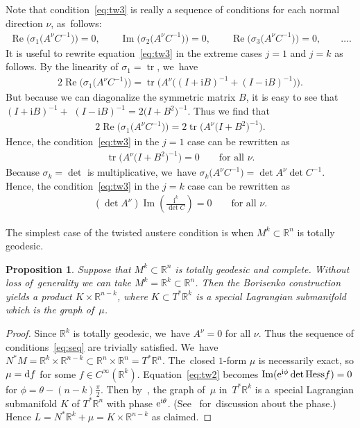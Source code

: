 \documentclass[10pt,a4paper]{amsart}
\def\R{\mathbb{R}}
\def\ri{\mathrm{i}}
\renewcommand{\Im}{\operatorname{Im}}
\renewcommand{\Re}{\operatorname{Re}}
\def\tr{\operatorname{tr}}
\newtheorem{Proposition}[Theorem]{Proposition}
\numberwithin{equation}{section}
\begin{document}
Note that condition~\eqref{eq:tw3} is really a sequence of conditions for each normal direction $\nu$, as~follows:
\begin{gather} \label{eq:seq}
\Re \big(\sigma_1 \big(A^\nu C^{-1}\big) \big) = 0, \qquad
\Im \big(\sigma_2 \big(A^\nu C^{-1}\big) \big) = 0, \qquad
\Re \big(\sigma_3 \big(A^\nu C^{-1}\big) \big) = 0, \qquad \dots.
\end{gather}
It is useful to rewrite equation~\eqref{eq:tw3} in the extreme cases $j=1$ and $j=k$ as follows. By the linearity of $\sigma_1 = \tr$, we~have
\begin{gather*}
2 \Re \big(\sigma_1 \big(A^\nu C^{-1}\big)\big) = \tr \big(A^{\nu} \big((I + \ri B)^{-1} + (I - \ri B)^{-1}\big)\big).
\end{gather*}
But because we can diagonalize the symmetric matrix $B$, it is easy to see that $(I + \ri B)^{-1} +$ $(I - \ri B)^{-1} = 2 \big(I + B^2\big)^{-1}$. Thus we find that
\begin{gather*}
2 \Re \big( \sigma_1 \big(A^\nu C^{-1}\big) \big) = 2 \tr \big( A^{\nu} \big(I + B^2\big)^{-1} \big).
\end{gather*}
Hence, the condition~\eqref{eq:tw3} in the $j=1$ case can be rewritten as
\begin{gather} \label{eq:tw3-special1}
\tr \big(A^{\nu} \big(I + B^2\big)^{-1}\big) = 0 \qquad \text{for all $\nu$}.
\end{gather}
Because $\sigma_k = \det$ is multiplicative, we~have $\sigma_k \big(A^{\nu} C^{-1}\big) = \det A^{\nu} \det C^{-1}$. Hence, the condition~\eqref{eq:tw3} in the $j=k$ case can be rewritten as
\begin{gather}\label{eq:tw3-specialk}
(\det A^{\nu}) \Im \left(\frac{\ri^k}{\det C}\right) = 0 \qquad \text{for all $\nu$}.
\end{gather}

The simplest case of the twisted austere condition is when $M^k \subset \R^n$ is totally geodesic.

\begin{Proposition} \label{prop:totally-geodesic}
Suppose that $M^k \subset \R^n$ is \emph{totally geodesic} and complete. Without loss of~gene\-ra\-lity we can take $M^k = \R^k \subset \R^n$. Then the Borisenko construction yields a pro\-duct $K \times \R^{n-k}$, where $K \subset T^* \R^k$ is a special Lagrangian submanifold which is the graph of~$\mu$.
\end{Proposition}
\begin{proof}
Since $\R^k$ is totally geodesic, we~have $A^{\nu} = 0$ for all $\nu$. Thus the sequence of conditions~\eqref{eq:seq} are trivially satisfied. We~have $N^* M = \R^k \times \R^{n-k} \subset \R^n \times \R^n = T^* \R^n$. The~closed $1$-form $\mu$ is necessarily exact, so $\mu = {\rm d} f$ for some $f \in C^{\infty} (\R^k)$. Equation~\eqref{eq:tw2} becomes $\Im ({\rm e}^{\ri \phi} \det \mathrm{Hess} f) = 0$ for $\phi = \theta - (n-k) \frac{\pi}{2}$. Then by~\cite[Theorem 2.3]{HL}, the graph of~$\mu$ in~$T^* \R^k$ is a~special Lagrangian submanifold $K$ of $T^* \R^n$ with phase ${\rm e}^{\ri \theta}$. (See~\cite[Theorem 2.3]{KL} for~discus\-sion about the phase.) Hence $L = N^* \R^k + \mu = K \times \R^{n-k}$ as claimed.
\end{proof}
\end{document}
